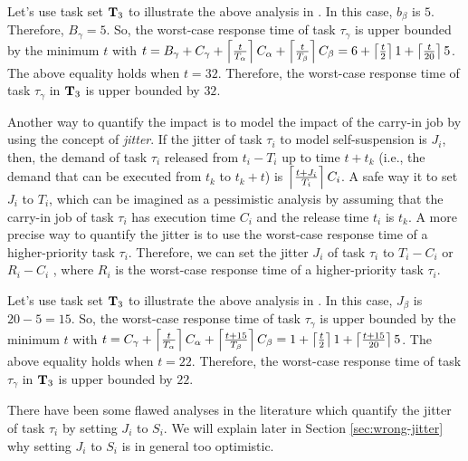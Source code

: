 \begin{itemize}
\begin{itemize}
Let's use task set ${\bf T}_3$ to illustrate the above analysis in \cite[Page 164-165]{Liu:2000:RS:518501}. In this case, $b_\beta$ is $5$. Therefore, $B_\gamma = 5$. So, the worst-case response time of task $\tau_\gamma$ is upper bounded by the minimum $t$ with $t=B_\gamma+C_\gamma+\left\lceil{\frac{t}{T_\alpha}}\right\rceil C_\alpha +\left\lceil{\frac{t}{T_{\beta}}}\right\rceil C_\beta = 6+\left\lceil{\frac{t}{2}}\right\rceil 1 +\left\lceil{\frac{t}{20}}\right\rceil 5$. The above equality holds when $t=32$. Therefore, the worst-case response time of task $\tau_{\gamma}$ in ${\bf T}_3$ is upper bounded by $32$.
\vspace{0.1in}


Another way to quantify the impact is to model the impact of the carry-in job by using the concept of \emph{jitter}. If the jitter of task $\tau_i$ to model self-suspension is $J_i$, then, the demand of task $\tau_i$ released from $t_i-T_i$ up to time $t+t_k$  (i.e., the demand that can be executed from $t_k$ to $t_k+t$) is $\left\lceil{\frac{t+J_i}{T_i} }\right\rceil C_i$. A safe way it to set $J_i$ to $T_i$, which can be imagined as a pessimistic analysis by assuming that the carry-in job of task $\tau_i$ has execution time $C_i$ and the release time $t_i$ is $t_k$. A more precise way to quantify the jitter is to use the worst-case response time of a higher-priority task $\tau_i$. Therefore, we can set the jitter $J_i$ of task $\tau_i$ to $T_i-C_i$ \cite{huangpass:dac2015,Raj:suspension1991} or  $R_i-C_i$ \cite{huangpass:dac2015}, where $R_i$ is the worst-case response time of a higher-priority task $\tau_i$. 

Let's use task set ${\bf T}_3$ to illustrate the above analysis in \cite{huangpass:dac2015}. In this case, $J_\beta$ is $20-5=15$. So, the worst-case response time of task $\tau_\gamma$ is upper bounded by the minimum $t$ with $t=C_\gamma+\left\lceil{\frac{t}{T_\alpha}}\right\rceil C_\alpha +\left\lceil{\frac{t+15}{T_{\beta}}}\right\rceil C_\beta = 1+\left\lceil{\frac{t}{2}}\right\rceil 1 +\left\lceil{\frac{t+15}{20}}\right\rceil 5$. The above equality holds when $t=22$. Therefore, the worst-case response time of task $\tau_{\gamma}$ in ${\bf T}_3$ is upper bounded by $22$.


There have been some flawed analyses in the literature \cite{ECRTS-AudsleyB04,RTAS-AudsleyB04,RTCSA-KimCPKH95} which quantify the jitter of task $\tau_i$ by setting $J_i$ to $S_i$. We will explain later in Section \ref{sec:wrong-jitter} why setting $J_i$ to $S_i$ is in general too optimistic. 


\end{itemize}
\end{itemize}

